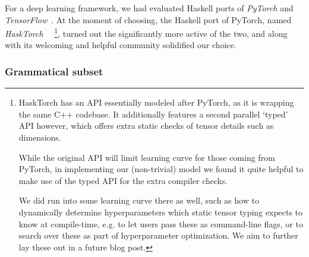 \documentclass{article}
\begin{document}
For a deep learning framework, we had evaluated Haskell ports of
\emph{PyTorch} and \emph{TensorFlow}~\citep{abadi2016tensorflow}.
At the moment of choosing, the Haskell port of PyTorch,
named \emph{HaskTorch}~\citep{hasktorch}%
~\footnote{
    HaskTorch has an API essentially modeled after PyTorch, as it is wrapping the same C++ codebase.
    It additionally features a second parallel `typed' API however,
    which offers extra static checks of tensor details such as dimensions.

    While the original API will limit learning curve for those coming from PyTorch,
    in implementing our (non-trivial) model we found it quite helpful
    to make use of the typed API for the extra compiler checks.

    We did run into some learning curve there as well,
    such as how to dynamically determine hyperparameters
    which static tensor typing expects to know at compile-time,
    e.g. to let users pass these as command-line flags,
    or to search over these as part of hyperparameter optimization.
    We aim to further lay these out in a future blog post.
},
turned out the significantly more active of the two,
and along with its welcoming and helpful community solidified our choice.

\subsubsection{Grammatical subset} \label{sec:grammar}


\end{document}
